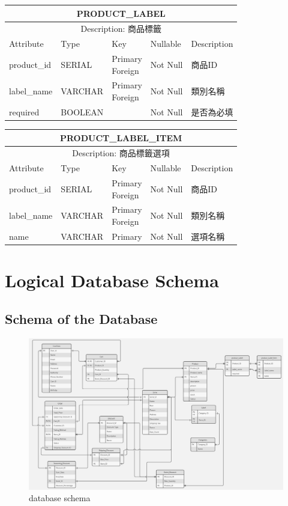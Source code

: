 \documentclass[a4paper, 12pt]{article}
\begin{document}
\noindent\begin{tabular}{ | p{7em} | p{5.5em} | p{5.5em} | p{4.5em} | p{11em} |}
  \hline
  \multicolumn{5}{|c|}{PRODUCT_LABEL} \tabularnewline
  \hline 
  \multicolumn{5}{|c|}{Description: 商品標籤} \tabularnewline
  \hline 
  Attribute & Type & Key & Nullable & Description \\
  \hline
  product_id & SERIAL & \makecell[l]{Primary \\ Foreign} & Not Null & 商品ID \\
  \hline
  label_name & VARCHAR & \makecell[l]{Primary \\ Foreign} & Not Null & 類別名稱 \\
  \hline
  required & BOOLEAN & & Not Null & 是否為必填\\
  \hline
\end{tabular}

\noindent\begin{tabular}{ | p{7em} | p{5.5em} | p{5.5em} | p{4.5em} | p{11em} |}
  \hline
  \multicolumn{5}{|c|}{PRODUCT_LABEL_ITEM} \tabularnewline
  \hline 
  \multicolumn{5}{|c|}{Description: 商品標籤選項} \tabularnewline
  \hline 
  Attribute & Type & Key & Nullable & Description \\
  \hline
  product_id & SERIAL & \makecell[l]{Primary \\ Foreign} & Not Null & 商品ID \\
  \hline
  label_name & VARCHAR & \makecell[l]{Primary \\ Foreign} & Not Null & 類別名稱 \\
  \hline
  name & VARCHAR & Primary & Not Null & 選項名稱\\
  \hline
\end{tabular}

\newpage

\section{Logical Database Schema}
\subsection{Schema of the Database}

\begin{figure}[h]
    \centerline{\includegraphics[width=40em]{schema-diagram.jpg}}    
    \caption{database schema}
    \label{fig:enter-label}
\end{figure}
\end{document}
